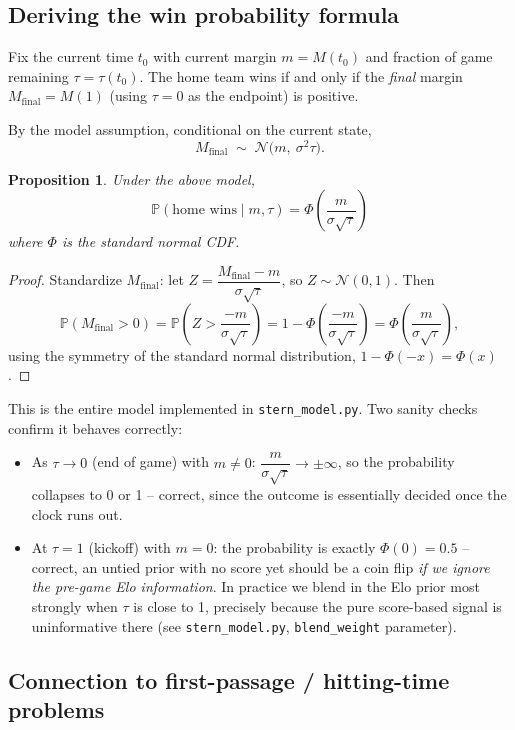 \documentclass[11pt]{article}
\newtheorem{proposition}{Proposition}
\begin{document}
\subsection{Deriving the win probability formula}

Fix the current time $t_0$ with current margin $m = M(t_0)$ and fraction of
game remaining $\tau = \tau(t_0)$. The home team wins if and only if the
\emph{final} margin $M_{\text{final}} = M(1) $ (using $\tau=0$ as the
endpoint) is positive.

By the model assumption, conditional on the current state,
\[
M_{\text{final}} \;\sim\; \mathcal{N}\!\big(m,\ \sigma^2 \tau\big).
\]

\begin{proposition}
Under the above model,
\[
\mathbb{P}(\text{home wins} \mid m, \tau) = \Phi\!\left(\frac{m}{\sigma\sqrt{\tau}}\right)
\]
where $\Phi$ is the standard normal CDF.
\end{proposition}

\begin{proof}
Standardize $M_{\text{final}}$: let $Z = \dfrac{M_{\text{final}} - m}{\sigma\sqrt{\tau}}$,
so $Z \sim \mathcal{N}(0,1)$. Then
\[
\mathbb{P}(M_{\text{final}} > 0)
= \mathbb{P}\!\left(Z > \frac{-m}{\sigma\sqrt{\tau}}\right)
= 1 - \Phi\!\left(\frac{-m}{\sigma\sqrt{\tau}}\right)
= \Phi\!\left(\frac{m}{\sigma\sqrt{\tau}}\right),
\]
using the symmetry of the standard normal distribution, $1-\Phi(-x) = \Phi(x)$.
\end{proof}

This is the entire model implemented in \texttt{stern\_model.py}. Two
sanity checks confirm it behaves correctly:
\begin{itemize}
\item As $\tau \to 0$ (end of game) with $m \ne 0$: $\dfrac{m}{\sigma\sqrt{\tau}} \to \pm\infty$,
so the probability collapses to 0 or 1 -- correct, since the outcome is
essentially decided once the clock runs out.
\item At $\tau = 1$ (kickoff) with $m = 0$: the probability is exactly
$\Phi(0) = 0.5$ -- correct, an untied prior with no score yet should be a
coin flip \emph{if we ignore the pre-game Elo information}. In practice we
blend in the Elo prior most strongly when $\tau$ is close to 1, precisely
because the pure score-based signal is uninformative there (see
\texttt{stern\_model.py}, \texttt{blend\_weight} parameter).
\end{itemize}

\subsection{Connection to first-passage / hitting-time problems}
\end{document}
